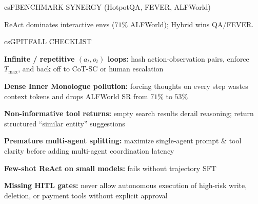 \documentclass[../../../../master.tex]{subfiles}
\begin{document}
\begin{cscolumns}
\begin{cscard}{csF}{BENCHMARK SYNERGY (HotpotQA, FEVER, ALFWorld)}
  \centering
  \par
  {\scriptsize ReAct dominates interactive envs ($71\%$ ALFWorld); Hybrid wins QA/FEVER.}
\end{cscard}
\columnbreak

\begin{cscard}{csG}{PITFALL CHECKLIST}
  \begin{csbul}
    \item \textbf{Infinite / repetitive $(a_t,o_t)$ loops:} hash action-observation pairs, enforce $T_{\max}$, and back off to CoT-SC or human escalation
    \item \textbf{Dense Inner Monologue pollution:} forcing thoughts on every step wastes context tokens and drops ALFWorld SR from $71\%$ to $53\%$
    \item \textbf{Non-informative tool returns:} empty search results derail reasoning; return structured ``similar entity'' suggestions
    \item \textbf{Premature multi-agent splitting:} maximize single-agent prompt \& tool clarity before adding multi-agent coordination latency
    \item \textbf{Few-shot ReAct on small models:} fails without trajectory SFT
    \item \textbf{Missing HITL gates:} never allow autonomous execution of high-risk write, deletion, or payment tools without explicit approval
  \end{csbul}
\end{cscard}


\end{cscolumns}
\end{document}

